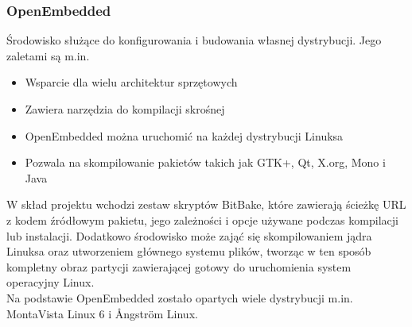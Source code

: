 \documentclass[a4paper,12pt]{book}
\begin{document}
				\subsubsection{OpenEmbedded}
					Środowisko służące do konfigurowania i budowania własnej dystrybucji. Jego zaletami są m.in.
					\begin{itemize}
						\item Wsparcie dla wielu architektur sprzętowych
						\item Zawiera narzędzia do kompilacji skrośnej
						\item OpenEmbedded można uruchomić na każdej dystrybucji Linuksa
						\item Pozwala na skompilowanie pakietów takich jak GTK+, Qt, X.org, Mono i Java
					\end{itemize}
					W skład projektu wchodzi zestaw skryptów BitBake, które zawierają ścieżkę URL z kodem źródłowym pakietu, jego zależności i opcje używane podczas kompilacji lub instalacji. Dodatkowo środowisko może zająć się skompilowaniem jądra Linuksa oraz utworzeniem głównego systemu plików, tworząc w ten sposób kompletny obraz partycji zawierającej gotowy do uruchomienia system operacyjny Linux.\\
					Na podstawie OpenEmbedded zostało opartych wiele dystrybucji m.in. MontaVista Linux 6 i \r{A}ngstr\"{o}m Linux.
\end{document}
